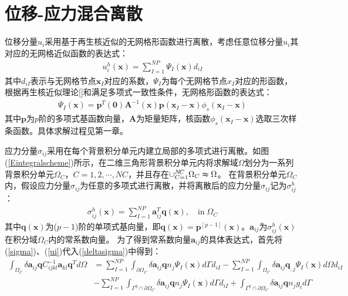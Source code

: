 \section{位移-应力混合离散}
位移分量$u_i$采用基于再生核近似的无网格形函数进行离散，考虑任意位移分量$u_i$其对应的无网格近似函数的表达式：
\begin{equation}\label{ui}
\begin{split}
    u^h_i(\pmb{x})=\sum_{I=1}^{N\!P}\Psi_I(\pmb{x})d_{iI}
\end{split}
\end{equation}
其中$d_{iI}$表示与无网格节点$\pmb{x}_I$对应的系数，$\Psi_I$为每个无网格节点$x_I$对应的形函数，根据再生核近似理论[]和满足多项式一致性条件，无网格形函数的表达式：
\begin{equation}
\begin{split}
    \Psi_I(\pmb{x})=\pmb{p}^T(\pmb{0})\pmb{A}^{-1}(\pmb{x})\pmb{p}(\pmb{x}_I-\pmb{x})\phi_s(\pmb{x}_I-\pmb{x})
\end{split}
\end{equation}
其中$\pmb{p}$为$p$阶的多项式基函数向量，$\pmb{A}$为矩量矩阵，核函数$\phi_s(\pmb{x}_I-\pmb{x})$选取三次样条函数。具体求解过程见第一章。\par
应力分量$\sigma_{ij}$采用在每个背景积分单元内建立局部的多项式进行离散。如图(\ref{Eintegralscheme})所示，在二维三角形背景积分单元内将求解域$\Omega$划分为一系列背景积分单元$\Omega_C$，$C=1,2,\dotsb,N\!C$，并且存在$\cup_{C=1}^{N\!C}\Omega_C\thickapprox\Omega$。
在背景积分单元$\Omega_C$内，假设应力分量$\sigma_{ij}$为任意的多项式进行离散，并将离散后的应力分量$\sigma_{ij}$记为$\sigma^h_{ij}$：
\begin{equation}\label{sigma}
\begin{split}
    \sigma^h_{ij}(\pmb{x})=\sum_{I=1}^{N\!P}\pmb{a}_{ij}^T\pmb{q}(\pmb{x}),\quad\text{in}\;\Omega_C
\end{split}
\end{equation}
其中$\pmb{q}(\pmb{x})$为($p-1$)阶的单项式基向量，即$\pmb{q}(\pmb{x})=\pmb{p}^{[p-1]}(\pmb{x})$。$\pmb{a}_{ij}$为$\sigma_{ij}^h(\pmb{x})$在积分域$\Omega_C$内的常系数向量。
为了得到常系数向量$\pmb{a}_{ij}$的具体表达式，首先将(\ref{sigma})、(\ref{ui})代入(\ref{deltasigma})中得到：
\begin{equation}
\begin{split}
    \int_{\Omega_C}\delta\pmb{a}_{ij}\pmb{q}C^{-1}_{ijkl}\pmb{a}_{kl}\pmb{q}^Td\Omega&=\sum_{I=1}^{N\!P}\int_{\partial\Omega_C}\delta\pmb{a}_{ij}\pmb{q}n_j\Psi_I(\pmb{x})d\Gamma d_{iI}-\sum_{I=1}^{N\!P}\int_{\Omega_C}\delta\pmb{a}_{ij}\pmb{q}_{,j}\Psi_{I}(\pmb{x})d\Omega d_{iI}\\
     &-\sum_{I=1}^{N\!P}\int_{\Gamma^g\cap\partial\Omega_C}\delta\pmb{a}_{ij}\pmb{q}n_j\Psi_I(\pmb{x})d\Gamma d_{iI}+\int_{\Gamma^g\cap\partial\Omega_C}\delta\pmb{a}_{ij}\pmb{q}n_jg_id\Gamma
\end{split}
\end{equation}
